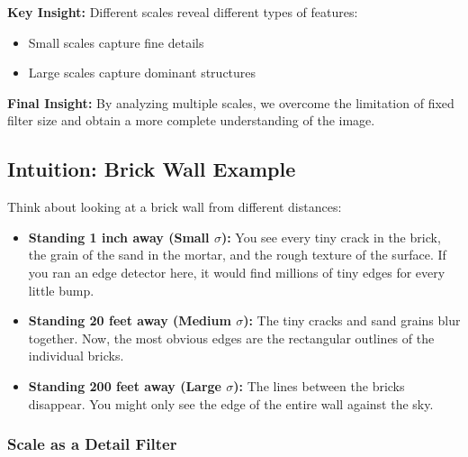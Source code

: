 \documentclass[12pt]{article}
\begin{document}
\textbf{Key Insight:}
Different scales reveal different types of features:
\begin{itemize}
    \item Small scales capture fine details
    \item Large scales capture dominant structures
\end{itemize}

\textbf{Final Insight:}
By analyzing multiple scales, we overcome the limitation of fixed filter size and obtain a more complete understanding of the image.

\subsection{Intuition: Brick Wall Example}

Think about looking at a brick wall from different distances:

\begin{itemize}
    \item \textbf{Standing 1 inch away (Small $\sigma$):}
          You see every tiny crack in the brick, the grain of the sand in the mortar, and the rough texture of the surface.
          If you ran an edge detector here, it would find millions of tiny edges for every little bump.

    \item \textbf{Standing 20 feet away (Medium $\sigma$):}
          The tiny cracks and sand grains blur together.
          Now, the most obvious edges are the rectangular outlines of the individual bricks.

    \item \textbf{Standing 200 feet away (Large $\sigma$):}
          The lines between the bricks disappear.
          You might only see the edge of the entire wall against the sky.
\end{itemize}

\subsubsection*{Scale as a Detail Filter}
\end{document}
